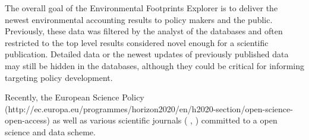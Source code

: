 The overall goal of the Environmental Footprints Explorer is to deliver the newest environmental accounting results to policy makers and the public. Previously, these data was filtered by the analyst of the databases and often restricted to the top level results considered novel enough for a scientific publication. Detailed data or the newest updates of previously published data may still be hidden in the databases, although they could be critical for informing targeting policy development.

Recently, the European Science Policy (http://ec.europa.eu/programmes/horizon2020/en/h2020-section/open-science-open-access) as well as various scientific journals (\cite{Hanson_2011} \cite{Stodden_2012}, \cite{Boulton_2012}) committed to a open science and data scheme. 